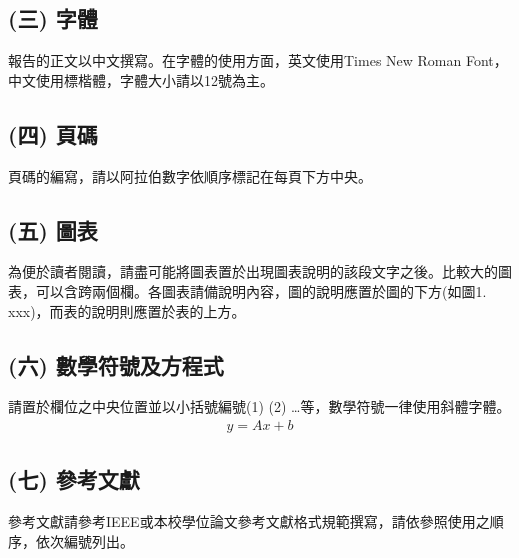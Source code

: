\documentclass[]{NTUTCSIEproject}
\begin{document}
\subsection*{(三) 字體}

報告的正文以中文撰寫。在字體的使用方面，英文使用Times New Roman Font，中文使用標楷體，字體大小請以12號為主。

\subsection*{(四) 頁碼}

頁碼的編寫，請以阿拉伯數字依順序標記在每頁下方中央。

\subsection*{(五) 圖表}

為便於讀者閱讀，請盡可能將圖表置於出現圖表說明的該段文字之後。比較大的圖表，可以含跨兩個欄。各圖表請備說明內容，圖的說明應置於圖的下方(如圖1. xxx)，而表的說明則應置於表的上方。

\subsection*{(六) 數學符號及方程式}

請置於欄位之中央位置並以小括號編號(1) (2) …等，數學符號一律使用斜體字體。
\begin{align}
y=Ax+b
\end{align}
\subsection*{(七) 參考文獻}

參考文獻請參考IEEE或本校學位論文參考文獻格式規範撰寫，請依參照使用之順序，依次編號列出。\cite{englishExample}\cite{chineseExample}

\printbibliography[title=參考文獻]
\end{document}
